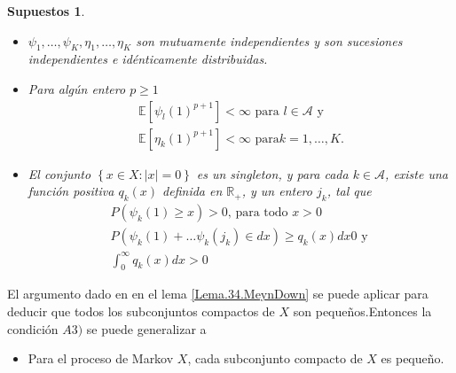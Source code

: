 \documentclass{article}
\newtheorem{Sup}{Supuestos}
\newcommand{\rea}{\mathbb{R}}
\newcommand{\esp}{\mathbb{E}}
\begin{document}
\begin{Sup}
\begin{itemize}
\item[A1)] $\psi_{1},\ldots,\psi_{K},\eta_{1},\ldots,\eta_{K}$ son
mutuamente independientes y son sucesiones independientes e
id\'enticamente distribuidas.

\item[A2)] Para alg\'un entero $p\geq1$
\begin{eqnarray*}
\esp\left[\psi_{l}\left(1\right)^{p+1}\right]<\infty\textrm{ para }l\in\mathcal{A}\textrm{ y }\\
\esp\left[\eta_{k}\left(1\right)^{p+1}\right]<\infty\textrm{ para
}k=1,\ldots,K.
\end{eqnarray*}
\item[A3)] El conjunto $\left\{x\in X:|x|=0\right\}$ es un
singleton, y para cada $k\in\mathcal{A}$, existe una funci\'on
positiva $q_{k}\left(x\right)$ definida en $\rea_{+}$, y un entero
$j_{k}$, tal que
\begin{eqnarray}
P\left(\psi_{k}\left(1\right)\geq x\right)>0\textrm{, para todo }x>0\\
P\left(\psi_{k}\left(1\right)+\ldots\psi_{k}\left(j_{k}\right)\in dx\right)\geq q_{k}\left(x\right)dx0\textrm{ y }\\
\int_{0}^{\infty}q_{k}\left(x\right)dx>0
\end{eqnarray}
\end{itemize}
\end{Sup}

El argumento dado en \cite{MaynDown} en el lema
\ref{Lema.34.MeynDown} se puede aplicar para deducir que todos los
subconjuntos compactos de $X$ son peque\~nos.Entonces la
condici\'on $A3)$ se puede generalizar a
\begin{itemize}
\item[A3')] Para el proceso de Markov $X$, cada subconjunto
compacto de $X$ es peque\~no.
\end{itemize}
\end{document}
